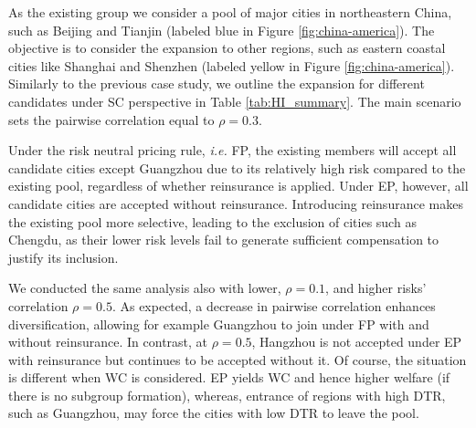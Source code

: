 \documentclass[fleqn,mnsc,nonblindrev]{informs4}
\begin{document}

As the existing group we consider a pool of major cities in northeastern China, such as Beijing and Tianjin (labeled blue in Figure \ref{fig:china-america}). The objective is to consider the expansion to other regions, such as eastern coastal cities like Shanghai and Shenzhen (labeled yellow in Figure \ref{fig:china-america}). Similarly to the previous case study, we outline the expansion for different candidates under SC perspective in Table \ref{tab:HI_summary}. The main scenario sets the pairwise correlation equal to $\rho=0.3$.

Under the risk neutral pricing rule, \textit{i.e.} FP, the existing members will accept all candidate cities except Guangzhou due to its relatively high risk compared to the existing pool, regardless of whether reinsurance is applied. Under EP, however, all candidate cities are accepted without reinsurance. Introducing reinsurance makes the existing pool more selective, leading to the exclusion of cities such as Chengdu, as their lower risk levels fail to generate sufficient compensation to justify its inclusion.

We conducted the same analysis also with lower, $\rho=0.1$, and higher risks' correlation $\rho=0.5$. As expected, a decrease in pairwise correlation enhances diversification, allowing for example Guangzhou to join under FP with and without reinsurance. In contrast, at $\rho=0.5$, Hangzhou is not accepted under EP with reinsurance but continues to be accepted without it. Of course, the situation is different when WC is considered. EP yields WC and hence higher welfare (if there is no subgroup formation), whereas, entrance of regions with high DTR, such as Guangzhou, may force the cities with low DTR to leave the pool. 
\end{document}
